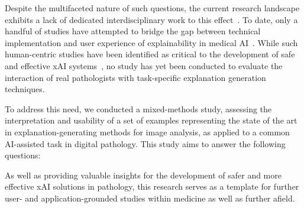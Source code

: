 Despite the multifaceted nature of such questions, the current research landscape exhibits a lack of dedicated interdisciplinary work to this effect~\cite{antoniadi2021current}. To date, only a handful of studies have attempted to bridge the gap between technical implementation and user experience of explainability in medical AI~\cite{liao2020questioning,cai2019hello,wang_designing_2019}. While such human-centric studies have been identified as critical to the development of safe and effective xAI systems~\cite{doshi2017towards, regitnig_expectations_2020, antoniadi2021current}, no study has yet been conducted to evaluate the interaction of real pathologists with task-specific explanation generation techniques.



To address this need, we conducted a mixed-methods study, assessing the interpretation and usability of a set of examples representing the state of the art in explanation-generating methods for image analysis, as applied to a common AI-assisted task in digital pathology. This study aims to answer the following questions:

\researchquestions


As well as providing valuable insights for the development of safer and more effective xAI solutions in pathology, this research serves as a template for further user- and application-grounded studies within medicine as well as further afield.


